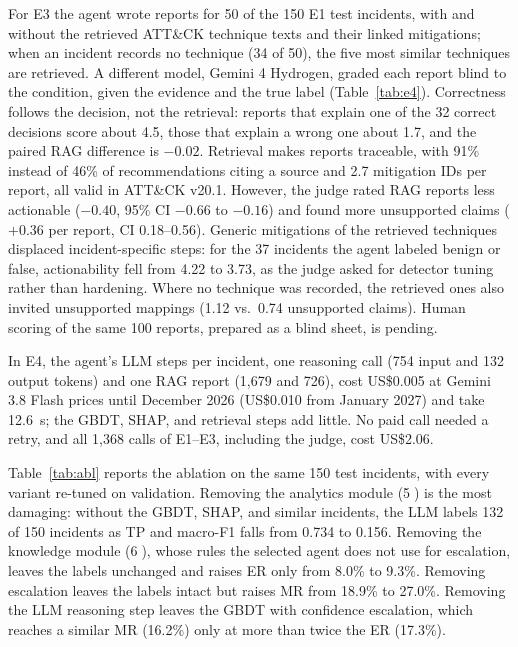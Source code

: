 \documentclass[conference]{IEEEtran}
\begin{document}
For E3 the agent wrote reports for 50 of the 150 E1 test incidents,
with and without the retrieved ATT\&CK technique texts and their linked
mitigations; when an incident records no technique (34 of 50), the
five most similar techniques are retrieved. A different model, Gemini
4 Hydrogen, graded each report blind to the condition, given the
evidence and the true label (Table~\ref{tab:e4}). Correctness follows
the decision, not the retrieval: reports that explain one of the 32
correct decisions score about 4.5, those that explain a wrong one about
1.7, and the paired RAG difference is $-0.02$. Retrieval makes reports
traceable, with 91\% instead of 46\% of recommendations citing a
source and 2.7 mitigation IDs per report, all valid in ATT\&CK v20.1.
However, the judge rated RAG reports less actionable ($-0.40$, 95\% CI
$-0.66$ to $-0.16$) and found more unsupported claims ($+0.36$ per
report, CI 0.18--0.56). Generic mitigations of the retrieved
techniques displaced incident-specific steps: for the 37 incidents the
agent labeled benign or false, actionability fell from 4.22 to 3.73,
as the judge asked for detector tuning rather than hardening. Where no
technique was recorded, the retrieved ones also invited unsupported
mappings (1.12 vs.\ 0.74 unsupported claims). Human scoring of the same
100 reports, prepared as a blind sheet, is pending.

In E4, the agent's LLM steps per incident, one reasoning call (754
input and 132 output tokens) and one RAG report (1{,}679 and 726),
cost US\$0.005 at Gemini 3.8 Flash prices until December 2026
(US\$0.010 from January 2027) and take 12.6~s; the GBDT, SHAP, and
retrieval steps add little. No paid call needed a retry, and all
1{,}368 calls of E1--E3, including the judge, cost US\$2.06.

Table~\ref{tab:abl} reports the ablation on the same 150 test
incidents, with every variant re-tuned on validation. Removing the
analytics module (\textcircled{5}) is the most damaging: without the
GBDT, SHAP, and similar incidents, the LLM labels 132 of 150 incidents
as TP and macro-F1 falls from 0.734 to 0.156. Removing the knowledge
module (\textcircled{6}), whose rules the selected agent does not use
for escalation, leaves the labels unchanged and raises ER only from
8.0\% to 9.3\%. Removing escalation leaves the labels intact but raises
MR from 18.9\% to 27.0\%. Removing the LLM reasoning step leaves the
GBDT with confidence escalation, which reaches a similar MR (16.2\%)
only at more than twice the ER (17.3\%).
\end{document}
